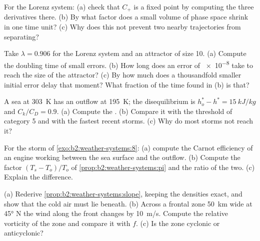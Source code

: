 \begin{exercise}[$\star\star$]\label{exo:b2:weather-systems:6}
For the Lorenz system: (a) check that $C_+$ is a fixed point by computing the three derivatives
there. (b) By what factor does a small volume of phase space shrink in one time unit? (c) Why
does this not prevent two nearby trajectories from separating?
\end{exercise}

\begin{exercise}[$\star\star$]\label{exo:b2:weather-systems:7}
Take $\lambda = 0.906$ for the Lorenz system and an attractor of size 10. (a) Compute the
doubling time of small errors. (b) How long does an error of \num{e-8} take to reach the size of
the attractor? (c) By how much does a thousandfold smaller initial error delay that moment? What
fraction of the time found in (b) is that?
\end{exercise}

\begin{exercise}[$\star\star$]\label{exo:b2:weather-systems:8}
A sea at \qty{303}{K} has an outflow at \qty{195}{K}; the disequilibrium is $h_o^* - h^* =
\qty{15}{kJ/kg}$ and $C_k/C_D = 0.9$. (a) Compute the . (b) Compare it with
the threshold of category 5 and with the fastest recent storms. (c) Why do most storms not reach
it?
\end{exercise}

\begin{exercise}[$\star\star$]\label{exo:b2:weather-systems:9}
For the storm of \cref{exo:b2:weather-systems:8}: (a) compute the Carnot efficiency of an engine
working between the sea surface and the outflow. (b) Compute the factor $(T_s - T_o)/T_o$ of
\cref{prop:b2:weather-systems:pi} and the ratio of the two. (c) Explain the difference.
\end{exercise}

\begin{exercise}[$\star\star\star$]\label{exo:b2:weather-systems:10}
(a) Rederive \cref{prop:b2:weather-systems:slope}, keeping the densities exact, and show that
the cold air must lie beneath. (b) Across a frontal zone \qty{50}{km} wide at \ang{45} N the wind
along the front changes by \qty{10}{m/s}. Compute the relative vorticity of the zone and compare
it with $f$. (c) Is the zone cyclonic or anticyclonic?
\end{exercise}

